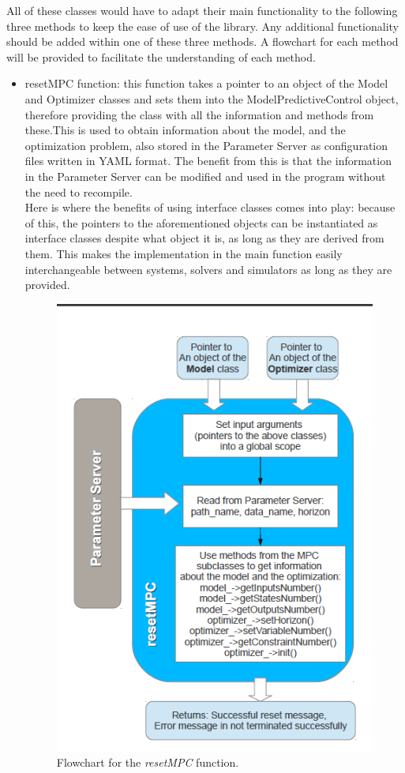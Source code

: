 All of these classes would have to adapt their main functionality to the following three methods to keep the ease of use of the library. Any additional functionality should be added within one of these three methods. A flowchart for each method will be provided to facilitate the understanding of each method. \newpage

\begin{itemize}
\item resetMPC function: this function takes a pointer to an object of the Model and Optimizer classes and sets them into the ModelPredictiveControl object, therefore providing the class with all the information and methods from these.This is used to obtain information about the model, and the optimization problem, also stored in the Parameter Server as configuration files written in YAML format. The benefit from this is that the information in the Parameter Server can be modified and used in the program without the need to recompile.\\

Here is where the benefits of using interface classes comes into play: because of this, the pointers to the aforementioned objects can be instantiated as interface classes despite what object it is, as long as they are derived from them. This makes the implementation in the main function easily interchangeable between systems, solvers and simulators as long as they are provided.

\begin{figure}[H]
\centering
\includegraphics[scale=0.8]{Images/Chapter4/resetMPCflowchart.png}
\caption{Flowchart for the \emph{resetMPC} function.}
\label{fig:resetMPC_flowchart}
\end{figure}


\end{itemize}
